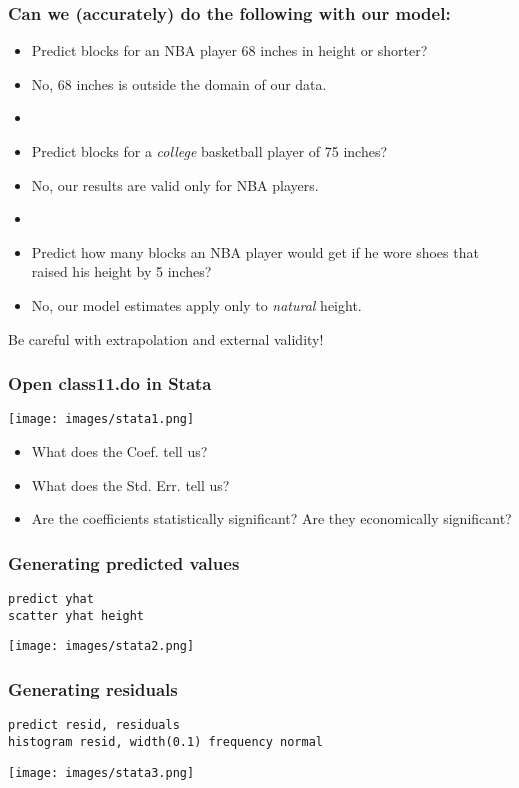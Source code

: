 \documentclass[11pt]{beamer}
\begin{document}
\begin{frame}
\frametitle{Can we (accurately) do the following with our model:}
\begin{itemize}
	\item Predict blocks for an NBA player 68 inches in height or shorter? \pause
	\item[] \tabto{1cm} No, 68 inches is outside the domain of our data. \pause
	\item[]
	\item Predict blocks for a \textit{college} basketball player of 75 inches? \pause
	\item[] \tabto{1cm} No, our results are valid only for NBA players. \pause
	\item[]
	\item Predict how many blocks an NBA player would get if he wore shoes that raised his height by 5 inches? \pause
	\item[] \tabto{1cm} No, our model estimates apply only to \textit{natural} height.
\end{itemize} \bigskip \pause
\begin{center}
	Be careful with \alert{extrapolation} and \alert{external validity}!
\end{center}
\end{frame}

\begin{frame}
\frametitle{Open class11.do in Stata}
\begin{center}
	\texttt{[image: images/stata1.png]}
\end{center}
\begin{itemize} \pause
	\item What does the Coef. tell us?
	\item What does the Std. Err. tell us?
	\item Are the coefficients statistically significant? Are they economically significant?
\end{itemize}
\end{frame}

\begin{frame}
\frametitle{Generating predicted values}
\texttt{predict yhat \\ scatter yhat height}
\begin{center}
	\texttt{[image: images/stata2.png]}
\end{center}
\end{frame}

\begin{frame}
\frametitle{Generating residuals}
\texttt{predict resid, residuals \\ histogram resid, width(0.1) frequency normal}
\begin{center}
	\texttt{[image: images/stata3.png]}
\end{center}
\end{frame}
\end{document}
